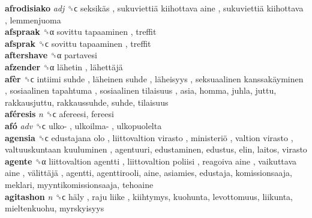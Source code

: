 \textbf{afrodisiako} \emph{adj}  ␝ϲ   seksikäs ,  sukuviettiä kiihottava aine ,  sukuviettiä kiihottava , lemmenjuoma  \\
\textbf{afspraak} ␝α   sovittu tapaaminen , treffit  \\
\textbf{afsprak} ␝ϲ   sovittu tapaaminen , treffit  \\
\textbf{aftershave} ␝α  partavesi  \\
\textbf{afzender} ␝α   lähetin ,  lähettäjä   \\
\textbf{afèr} ␝ϲ   intiimi suhde ,  läheinen suhde ,  läheisyys ,  seksuaalinen kanssakäyminen ,  sosiaalinen tapahtuma ,  sosiaalinen tilaisuus , asia, homma, juhla, juttu, rakkausjuttu, rakkaussuhde, suhde, tilaisuus  \\
\textbf{aféresis} \emph{n}  ␝ϲ  afereesi, fereesi  \\
\textbf{afó} \emph{adv}  ␝ϲ   ulko- ,  ulkoilma- , ulkopuolelta  \\
\textbf{agensia} ␝ϲ   edustajana olo ,  liittovaltion  virasto ,  ministeriö ,  valtion  virasto ,  valtuuskuntaan kuuluminen , agentuuri, edustaminen, edustus, elin, laitos, virasto  \\
\textbf{agente} ␝α   liittovaltion agentti ,  liittovaltion poliisi ,  reagoiva aine ,  vaikuttava aine ,  välittäjä , agentti, agenttirooli, aine, asiamies, edustaja, komissionsaaja, meklari, myyntikomissionsaaja, tehoaine  \\
\textbf{agitashon} \emph{n}  ␝ϲ   häly ,  raju liike , kiihtymys, kuohunta, levottomuus, liikunta, mieltenkuohu, myrskyisyys  \\
